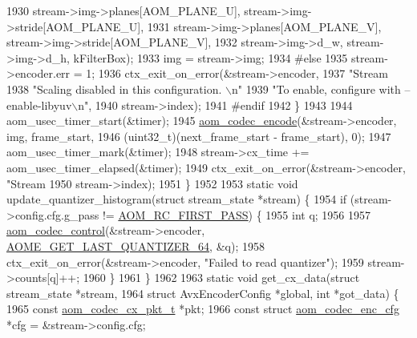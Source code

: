 \begin{DoxyCodeInclude}
{{{{{{{{{{{{{{{{{{{{{{{{{{{{{{{{{{{1930         stream->img->planes[AOM\_PLANE\_U], stream->img->stride[AOM\_PLANE\_U],
1931         stream->img->planes[AOM\_PLANE\_V], stream->img->stride[AOM\_PLANE\_V],
1932         stream->img->d\_w, stream->img->d\_h, kFilterBox);
1933     img = stream->img;
1934 \textcolor{preprocessor}{#else}
1935     stream->encoder.err = 1;
1936     ctx\_exit\_on\_error(&stream->encoder,
1937                       \textcolor{stringliteral}{"Stream %
1938                       \textcolor{stringliteral}{"Scaling disabled in this configuration. \(\backslash\)n"}
1939                       \textcolor{stringliteral}{"To enable, configure with --enable-libyuv\(\backslash\)n"},
1940                       stream->index);
1941 \textcolor{preprocessor}{#endif}
1942   \}
1943 
1944   aom\_usec\_timer\_start(&timer);
1945   \hyperlink{group__encoder_ga6f4a777de5389771e783df7ff1f116d4}{aom\_codec\_encode}(&stream->encoder, img, frame\_start,
1946                    (uint32\_t)(next\_frame\_start - frame\_start), 0);
1947   aom\_usec\_timer\_mark(&timer);
1948   stream->cx\_time += aom\_usec\_timer\_elapsed(&timer);
1949   ctx\_exit\_on\_error(&stream->encoder, \textcolor{stringliteral}{"Stream %
1950                     stream->index);
1951 \}
1952 
1953 \textcolor{keyword}{static} \textcolor{keywordtype}{void} update\_quantizer\_histogram(\textcolor{keyword}{struct} stream\_state *stream) \{
1954   \textcolor{keywordflow}{if} (stream->config.cfg.g\_pass != \hyperlink{group__encoder_gga92b6709b58dc3435e3ba652da562eda1ad342b33a290482c20238bfde5d9bea1e}{AOM\_RC\_FIRST\_PASS}) \{
1955     \textcolor{keywordtype}{int} q;
1956 
1957     \hyperlink{group__codec_ga6da974f4eeaba1fa74106b28d0fe6ac5}{aom\_codec\_control}(&stream->encoder, 
      \hyperlink{group__aom__encoder_ggae78dde67a6d78f332e9bdba0dde42db5a17b924cadd3c942f9e57fe6fc4d5e2ab}{AOME\_GET\_LAST\_QUANTIZER\_64}, &q);
1958     ctx\_exit\_on\_error(&stream->encoder, \textcolor{stringliteral}{"Failed to read quantizer"});
1959     stream->counts[q]++;
1960   \}
1961 \}
1962 
1963 \textcolor{keyword}{static} \textcolor{keywordtype}{void} get\_cx\_data(\textcolor{keyword}{struct} stream\_state *stream,
1964                         \textcolor{keyword}{struct} AvxEncoderConfig *global, \textcolor{keywordtype}{int} *got\_data) \{
1965   \textcolor{keyword}{const} \hyperlink{structaom__codec__cx__pkt}{aom\_codec\_cx\_pkt\_t} *pkt;
1966   \textcolor{keyword}{const} \textcolor{keyword}{struct }\hyperlink{structaom__codec__enc__cfg}{aom\_codec\_enc\_cfg} *cfg = &stream->config.cfg;
}}}}}}}}}}}}}}}}}}}}}}}}}}}}}}}}}}}}}
\end{DoxyCodeInclude}
